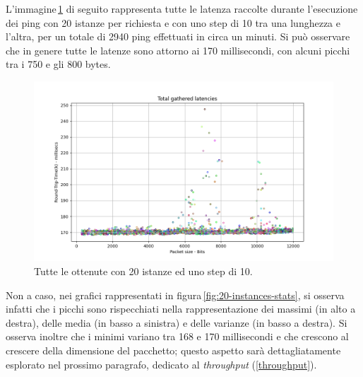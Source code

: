 L'immagine\,\ref{fig:20-instances-total} di seguito rappresenta tutte le latenza raccolte durante l'esecuzione dei ping con 20 istanze per richiesta e con uno step di 10 tra una lunghezza e l'altra, per un totale di 2940 ping effettuati in circa un minuti. Si può osservare che in genere tutte le latenze sono attorno ai 170 millisecondi, con alcuni picchi tra i 750 e gli 800 bytes.
\begin{figure}[h]
    \centering
    \includegraphics[width = .9\textwidth]{hw-2/report/imgs/20-instances/la-total-latencies.png}
    \caption{Tutte le ottenute con 20 istanze ed uno step di 10.}
    \label{fig:20-instances-total}
\end{figure}
Non a caso, nei grafici rappresentati in figura\,\ref{fig:20-instances-stats}, si osserva infatti che i picchi sono rispecchiati nella rappresentazione dei massimi (in alto a destra), delle media (in basso a sinistra) e delle varianze (in basso a destra). Si osserva inoltre che i minimi variano tra 168 e 170 millisecondi e che crescono al crescere della dimensione del pacchetto; questo aspetto sarà dettagliatamente esplorato nel prossimo paragrafo, dedicato al \textsl{throughput} (\ref{throughput}).
